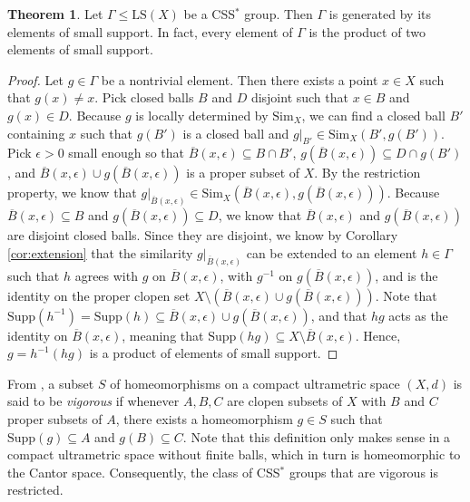 \documentclass[12pt]{amsart}
\numberwithin{equation}{subsection}
\theoremstyle{definition}
\newtheorem{theorem}{Theorem}[section]
\theoremstyle{definition}
\theoremstyle{remark}
\newcommand{\Sim}{\text{Sim}}
\newcommand{\supp}{\text{Supp}}
\begin{document}
\begin{theorem}\label{thm:smallsupp}
Let $\Gamma \leq \text{LS}(X)$ be a CSS$^*$ group. Then $\Gamma$ is generated by its elements of small support. In fact, every element of $\Gamma$ is the product of two elements of small support.
\end{theorem}
\begin{proof}
Let $g \in \Gamma$ be a nontrivial element. Then there exists a point $x \in X$ such that $g(x) \neq x$. Pick closed balls $B$ and $D$ disjoint such that $x \in B$ and $g(x) \in D$. Because $g$ is locally determined by $\Sim_X$, we can find a closed ball $B'$ containing $x$ such that $g(B')$ is a closed ball and $g\vert_{B'} \in \Sim_{X}(B', g(B'))$. Pick $\epsilon > 0$ small enough so that $\overline{B}(x, \epsilon ) \subseteq B \cap B'$, $g(\overline{B}(x,\epsilon)) \subseteq D \cap g(B')$, and $\overline{B}(x,\epsilon) \cup g(\overline{B}(x,\epsilon ))$ is a proper subset of $X$. By the restriction property, we know that $g\vert_{\overline{B}(x, \epsilon)} \in \Sim_{X}(\overline{B}(x, \epsilon ), g(\overline{B}(x,\epsilon)))$. Because $\overline{B}(x, \epsilon) \subseteq B$ and $g(\overline{B}(x,\epsilon)) \subseteq D$, we know that $\overline{B}(x, \epsilon)$ and $g(\overline{B}(x, \epsilon))$ are disjoint closed balls. Since they are disjoint, we know by Corollary \ref{cor:extension} that the similarity $g\vert_{\overline{B}(x,\epsilon)}$ can be extended to an element $h \in \Gamma$ such that $h$ agrees with $g$ on $\overline{B}(x,\epsilon)$, with $g^{-1}$ on $g(\overline{B}(x,\epsilon))$, and is the identity on the proper clopen set $X \setminus (\overline{B}(x, \epsilon) \cup g(\overline{B}(x, \epsilon)))$. Note that $\supp(h^{-1}) = \supp (h) \subseteq \overline{B}(x, \epsilon) \cup g(\overline{B}(x, \epsilon))$, and that $hg$ acts as the identity on $\overline{B}(x, \epsilon)$, meaning that $\supp (hg) \subseteq X \setminus \overline{B}(x, \epsilon)$. Hence, $g = h^{-1}(hg)$ is a product of elements of small support.
\end{proof}

From \cite{BleakEtAll2023}, a subset $S$ of homeomorphisms on a compact ultrametric space $(X,d)$ is said to be \emph{vigorous} if whenever $A,B,C$ are clopen subsets of $X$ with $B$ and $C$ proper subsets of $A$, there exists a homeomorphism $g \in S$ such that $\supp (g) \subseteq A$ and $g(B) \subseteq C$. Note that this definition only makes sense in a compact ultrametric space without finite balls, which in turn is homeomorphic to the Cantor space. Consequently, the class of CSS$^*$ groups that are vigorous is restricted.
\end{document}
